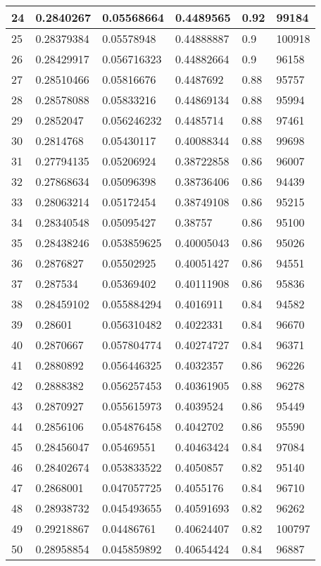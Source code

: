 \begin{longtable}{|l|l|l|l|l|l|}
24 & 0.2840267 & 0.05568664 & 0.4489565 & 0.92 & 99184 \\ \hline 
25 & 0.28379384 & 0.05578948 & 0.44888887 & 0.9 & 100918 \\ \hline 
26 & 0.28429917 & 0.056716323 & 0.44882664 & 0.9 & 96158 \\ \hline 
27 & 0.28510466 & 0.05816676 & 0.4487692 & 0.88 & 95757 \\ \hline 
28 & 0.28578088 & 0.05833216 & 0.44869134 & 0.88 & 95994 \\ \hline 
29 & 0.2852047 & 0.056246232 & 0.4485714 & 0.88 & 97461 \\ \hline 
30 & 0.2814768 & 0.05430117 & 0.40088344 & 0.88 & 99698 \\ \hline 
31 & 0.27794135 & 0.05206924 & 0.38722858 & 0.86 & 96007 \\ \hline 
32 & 0.27868634 & 0.05096398 & 0.38736406 & 0.86 & 94439 \\ \hline 
33 & 0.28063214 & 0.05172454 & 0.38749108 & 0.86 & 95215 \\ \hline 
34 & 0.28340548 & 0.05095427 & 0.38757 & 0.86 & 95100 \\ \hline 
35 & 0.28438246 & 0.053859625 & 0.40005043 & 0.86 & 95026 \\ \hline 
36 & 0.2876827 & 0.05502925 & 0.40051427 & 0.86 & 94551 \\ \hline 
37 & 0.287534 & 0.05369402 & 0.40111908 & 0.86 & 95836 \\ \hline 
38 & 0.28459102 & 0.055884294 & 0.4016911 & 0.84 & 94582 \\ \hline 
39 & 0.28601 & 0.056310482 & 0.4022331 & 0.84 & 96670 \\ \hline 
40 & 0.2870667 & 0.057804774 & 0.40274727 & 0.84 & 96371 \\ \hline 
41 & 0.2880892 & 0.056446325 & 0.4032357 & 0.86 & 96226 \\ \hline 
42 & 0.2888382 & 0.056257453 & 0.40361905 & 0.88 & 96278 \\ \hline 
43 & 0.2870927 & 0.055615973 & 0.4039524 & 0.86 & 95449 \\ \hline 
44 & 0.2856106 & 0.054876458 & 0.4042702 & 0.86 & 95590 \\ \hline 
45 & 0.28456047 & 0.05469551 & 0.40463424 & 0.84 & 97084 \\ \hline 
46 & 0.28402674 & 0.053833522 & 0.4050857 & 0.82 & 95140 \\ \hline 
47 & 0.2868001 & 0.047057725 & 0.4055176 & 0.84 & 96710 \\ \hline 
48 & 0.28938732 & 0.045493655 & 0.40591693 & 0.82 & 96262 \\ \hline 
49 & 0.29218867 & 0.04486761 & 0.40624407 & 0.82 & 100797 \\ \hline 
50 & 0.28958854 & 0.045859892 & 0.40654424 & 0.84 & 96887 \\ \hline 
\end{longtable}